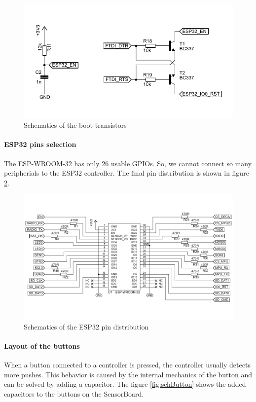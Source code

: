 \begin{figure}
	\centering
	\label{fig:schBoot}
	\caption{Schematics of the boot transistors}
	\includegraphics[scale=1.3]{img/SchBoot.pdf}
\end{figure}

\paragraph{ESP32 pins selection}
The ESP-WROOM-32 \cite{espressif:ESP-WROOM-32} has only 26 usable \ac{GPIO}s. So, we cannot connect so many peripherials to the ESP32 controller. The final pin distribution is shown in figure \ref{fig:schPinout}.

\begin{figure}
	\centering
	\label{fig:schPinout}
	\caption{Schematics of the ESP32 pin distribution}
	\includegraphics[scale=1.3, angle=90]{img/SchPinout.pdf}
\end{figure}

\paragraph{Layout of the buttons}
When a button connected to a controller is pressed, the controller usually detects more pushes. This behavior is caused by the internal mechanics of the button and can be solved by adding a capacitor. The figure \ref{fig:schButton} shows the added capacitors to the buttons on the SensorBoard.

